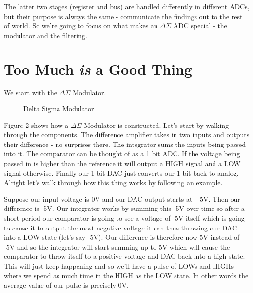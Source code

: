 \documentclass[10pt,a5paper]{book}
\begin{document}
The latter two stages (register and bus) are handled differently in different ADCs, but their purpose is always the same - communicate the findings out to the rest of world. So we're going to focus on what makes an $\Delta \Sigma$ ADC special - the modulator and the filtering.  

\section{Too Much \textit{is} a Good Thing}
We start with the $\Delta \Sigma$ Modulator.  

\begin{figure}[!htb]
\caption{\label{fig:my-label} Delta Sigma Modulator}
\end{figure}

Figure 2 shows how a $\Delta \Sigma$ Modulator is constructed. Let's start by walking through the components. The difference amplifier takes in two inputs and outputs their difference - no surprises there. The integrator sums the inputs being passed into it. The comparator can be thought of as a 1 bit ADC. If the voltage being passed in is higher than the reference it will output a HIGH signal and a LOW signal otherwise. Finally our 1 bit DAC just converts our 1 bit back to analog. Alright let's walk through how this thing works by following an example.

Suppose our input voltage is 0V and our DAC output starts at +5V. Then our difference is -5V. Our integrator works by summing this -5V over time so after a short period our comparator is going to see a voltage of -5V itself which is going to cause it to output the most negative voltage it can thus throwing our DAC into a LOW state (let's say -5V). Our difference is therefore now 5V instead of -5V and so the integrator will start summing up to 5V which will cause the comparator to throw itself to a positive voltage and DAC back into a high state. This will just keep happening and so we'll have a pulse of LOWs and HIGHs where we spend as much time in the HIGH as the LOW state. In other words the average value of our pulse is precisely 0V. 
\end{document}
